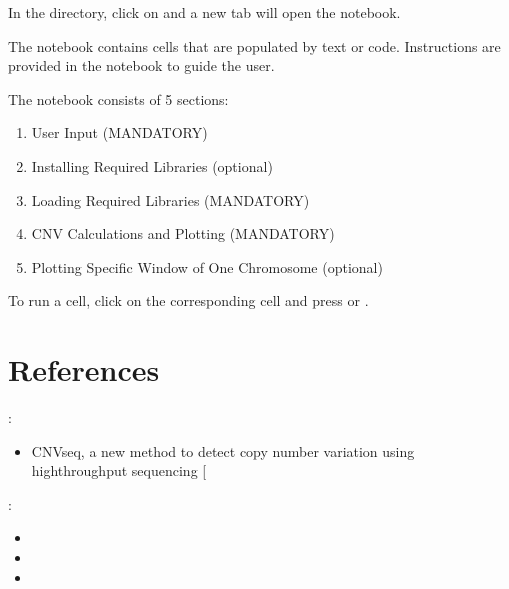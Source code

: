 \documentclass[letterpaper,10pt,english]{sphinxhowto}
\begin{document}
\sphinxAtStartPar
In the  directory, click on  and a new tab will open the notebook.

\sphinxAtStartPar
The notebook contains cells that are populated by text or code. Instructions are provided in the notebook to guide the user.

\sphinxAtStartPar
The notebook consists of 5 sections:
\begin{enumerate}
%
\item {} 
\sphinxAtStartPar
User Input (MANDATORY)

\item {} 
\sphinxAtStartPar
Installing Required Libraries (optional)

\item {} 
\sphinxAtStartPar
Loading Required Libraries (MANDATORY)

\item {} 
\sphinxAtStartPar
CNV Calculations and Plotting (MANDATORY)

\item {} 
\sphinxAtStartPar
Plotting Specific Window of One Chromosome (optional)

\end{enumerate}

\sphinxAtStartPar
To run a cell, click on the corresponding cell and press  or .


\section{References}
\label{\detokenize{index:references}}
\sphinxAtStartPar
{}:
\begin{itemize}
\item {} 
\sphinxAtStartPar
CNV\sphinxhyphen{}seq, a new method to detect copy number variation using high\sphinxhyphen{}throughput sequencing {[}\sphinxhref{https://bmcbioinformatics.biomedcentral.com/articles/10.1186/1471-2105-10-80}{LINK}{]}

\end{itemize}

\sphinxAtStartPar
{}:
\begin{itemize}
\item {} 
\sphinxAtStartPar
{}

\item {} 
\sphinxAtStartPar
{}

\item {} 
\sphinxAtStartPar
{}

\end{itemize}



\renewcommand{\indexname}{Index}
\printindex
\end{document}
